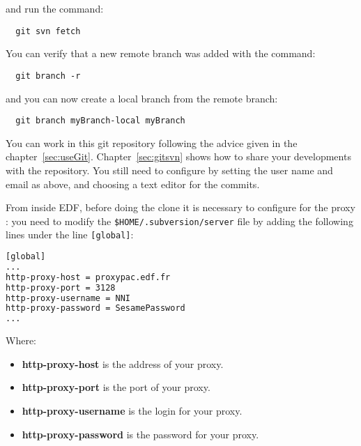 and run the command:
\begin{lstlisting}
  git svn fetch
\end{lstlisting}

You can verify that a new remote branch was added with the command:
\begin{lstlisting}
  git branch -r
\end{lstlisting}

and you can now create a local branch from the remote branch:
\begin{lstlisting}
  git branch myBranch-local myBranch
\end{lstlisting}

You can work in this git repository following the advice given in the chapter~\ref{sec:useGit}.
Chapter~\ref{sec:gitsvn} shows how to share your developments with the  repository.
You still need to configure  by setting the user name and email as above, and choosing a text editor for the commits.

From inside EDF, before doing the clone it is necessary to configure  for the proxy : you need to modify the \verb"$HOME/.subversion/server"
file by adding the following lines under the line \verb"[global]":
\begin{lstlisting}[language=bash]
[global]
...
http-proxy-host = proxypac.edf.fr
http-proxy-port = 3128
http-proxy-username = NNI
http-proxy-password = SesamePassword
...
\end{lstlisting}
Where:
\begin{itemize}
\item \textbf{http-proxy-host} is the address of your proxy.
\item \textbf{http-proxy-port} is the port of your proxy.
\item \textbf{http-proxy-username} is the login for your proxy.
\item \textbf{http-proxy-password} is the password for your proxy.
\end{itemize}
